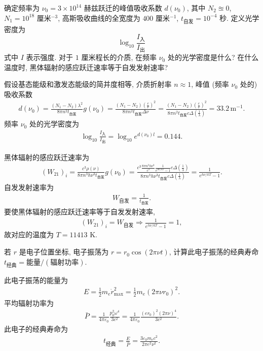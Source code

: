 \documentclass{note}
\begin{document}
\begin{exe}
    确定频率为 $\nu_0=3\times 10^{14}$ 赫兹跃迁的峰值吸收系数 $d(\nu_0)$, 其中 $N_2\approxeq 0$, $N_1=10^{18}$ 厘米${}^{-3}$, 高斯吸收曲线的全宽度为 $400$ 厘米${}^{-1}$, $t_{\text{自发}}=10^{-4}$ 秒. 定义光学密度为
    \[
        \log_{10}\frac{I_{\text{入}}}{I_{\text{出}}}
    \]
    式中 $I$ 表示强度. 对于 $1$ 厘米程长的介质, 在频率 $\nu_0$ 处的光学密度是什么? 在什么温度时, 黑体辐射的感应跃迁速率等于自发发射速率?
\end{exe}
\begin{sol}
    假设基态能级和激发态能级的简并度相等, 介质折射率 $n\approx 1$, 峰值 (频率 $\nu_0$ 处的) 吸收系数
    \begin{align}
        d(\nu_0)=\frac{(N_1-N_2)\lambda^2}{8\pi n^2t_{\text{自发}}}g(\nu_0)=\frac{(N_1-N_2)\left(\frac{c}{\nu}\right)^2}{8\pi n^2t_{\text{自发}}\Delta\nu}=\frac{(N_1-N_2)\left(\frac{c}{\nu}\right)^2}{8\pi n^2t_{\text{自发}}c\Delta\left(\frac{1}{\lambda}\right)}=33.2\,\text{m}^{-1}.
    \end{align}
    频率 $\nu_0$ 处的光学密度为
    \begin{align}
        \log_{10}\frac{I_{\text{入}}}{I_{\text{出}}}=\log_{10}e^{d(\nu_0)l}=0.144.
    \end{align}

    黑体辐射的感应跃迁速率为
    \begin{align}
        (W_{21})_i=\frac{c^3\rho(\nu)}{8\pi n^3h\nu^3t_{\text{自发}}}g(\nu_0)=\frac{c^3\frac{8\pi n^3h\nu^3}{c^3}\frac{1}{e^{h\nu/kT}-1}c\Delta\left(\frac{1}{\lambda}\right)}{8\pi n^3h\nu^3t_{\text{自发}}c\Delta\left(\frac{1}{\lambda}\right)}=\frac{1}{e^{h\nu/kT}-1}.
    \end{align}
    自发发射速率为
    \begin{align}
        W_{\text{自发}}=\frac{1}{t_{\text{自发}}}.
    \end{align}
    要使黑体辐射的感应跃迁速率等于自发发射速率,
    \begin{align}
        (W_{21})_i=W_{\text{自发}}\Longrightarrow\frac{1}{e^{h\nu/kT}-1}=1,
    \end{align}
    故对应的温度为 $T=11413$ K.
\end{sol}

\begin{exe}
    若 $r$ 是电子位置坐标, 电子振荡为 $r=r_0\cos(2\pi\nu t)$, 计算此电子振荡的经典寿命 $t_{\text{经典}}=\text{能量}/(\text{辐射功率})$.
\end{exe}
\begin{sol}
    此电子振荡的能量为
    \begin{align}
        E=\frac{1}{2}m_e\dot{r}_{\max}^2=\frac{1}{2}m_e(2\pi\nu r_0)^2.
    \end{align}
    平均辐射功率为
    \begin{align}
        \bar{P}=\frac{1}{4\pi\varepsilon_0}\frac{p_0^2\omega^4}{3c^2}=\frac{1}{4\pi\varepsilon_0}\frac{(er_0)^2(2\pi\nu)^4}{3c^2}.
    \end{align}
    此电子的经典寿命为
    \begin{align}
        t_{\text{经典}}=\frac{E}{\bar{P}}=\frac{3\varepsilon_0m_ec^2}{2\pi e^2\nu^2}.
    \end{align}
\end{sol}
\end{document}
